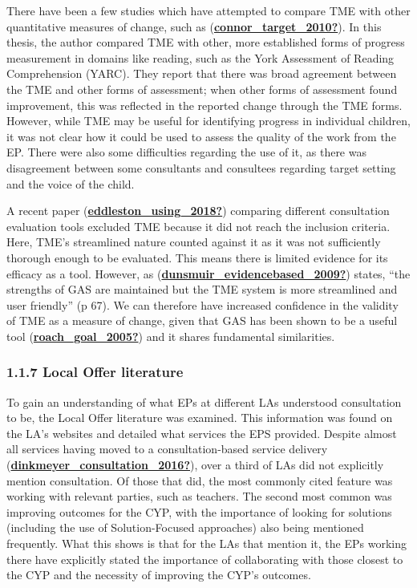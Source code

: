 \documentclass[
]{article}
\begin{document}
There have been a few studies which have attempted to compare TME with
other quantitative measures of change, such as
(\protect\hyperlink{ref-connor_target_2010}{\textbf{connor\_target\_2010?}}).
In this thesis, the author compared TME with other, more established
forms of progress measurement in domains like reading, such as the York
Assessment of Reading Comprehension (YARC). They report that there was
broad agreement between the TME and other forms of assessment; when
other forms of assessment found improvement, this was reflected in the
reported change through the TME forms. However, while TME may be useful
for identifying progress in individual children, it was not clear how it
could be used to assess the quality of the work from the EP. There were
also some difficulties regarding the use of it, as there was
disagreement between some consultants and consultees regarding target
setting and the voice of the child.

A recent paper
(\protect\hyperlink{ref-eddleston_using_2018}{\textbf{eddleston\_using\_2018?}})
comparing different consultation evaluation tools excluded TME because
it did not reach the inclusion criteria. Here, TME's streamlined nature
counted against it as it was not sufficiently thorough enough to be
evaluated. This means there is limited evidence for its efficacy as a
tool. However, as
(\protect\hyperlink{ref-dunsmuir_evidencebased_2009}{\textbf{dunsmuir\_evidencebased\_2009?}})
states, ``the strengths of GAS are maintained but the TME system is more
streamlined and user friendly'' (p 67). We can therefore have increased
confidence in the validity of TME as a measure of change, given that GAS
has been shown to be a useful tool
(\protect\hyperlink{ref-roach_goal_2005}{\textbf{roach\_goal\_2005?}})
and it shares fundamental similarities.

\hypertarget{local-offer-literature}{%
\subsubsection{1.1.7 Local Offer
literature}\label{local-offer-literature}}

To gain an understanding of what EPs at different LAs understood
consultation to be, the Local Offer literature was examined. This
information was found on the LA's websites and detailed what services
the EPS provided. Despite almost all services having moved to a
consultation-based service delivery
(\protect\hyperlink{ref-dinkmeyer_consultation_2016}{\textbf{dinkmeyer\_consultation\_2016?}}),
over a third of LAs did not explicitly mention consultation. Of those
that did, the most commonly cited feature was working with relevant
parties, such as teachers. The second most common was improving outcomes
for the CYP, with the importance of looking for solutions (including the
use of Solution-Focused approaches) also being mentioned frequently.
What this shows is that for the LAs that mention it, the EPs working
there have explicitly stated the importance of collaborating with those
closest to the CYP and the necessity of improving the CYP's outcomes.
\end{document}

